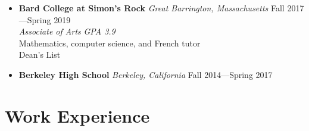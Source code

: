 \documentclass[12pt,letterpaper]{article}
\begin{document}
\begin{itemize}[label=]
	\item
	\textbf{Bard College at Simon's Rock} \textit{Great Barrington, Massachusetts} \hfill Fall 2017---Spring 2019\\
	\textit{Associate of Arts} \hfill \textit{GPA 3.9}\\
	Mathematics, computer science, and French tutor\\
    Dean's List

    \item 
        \textbf{Berkeley High School} \textit{Berkeley, California} \hfill Fall 2014---Spring 2017

\end{itemize}

\section*{Work Experience} \vspace{-0.5em}
\end{document}
